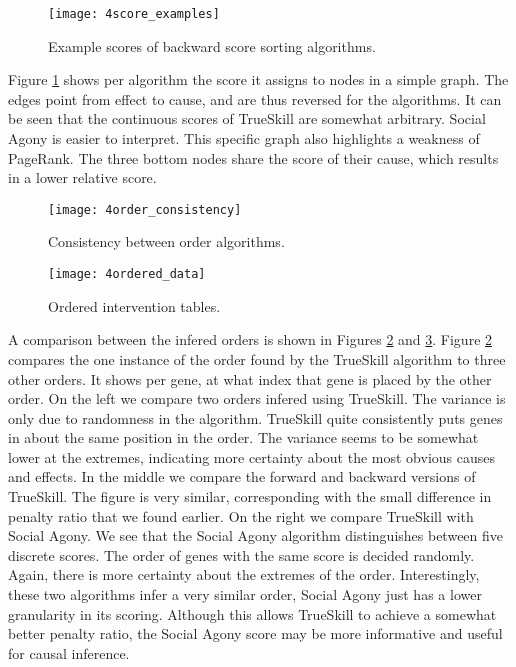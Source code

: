 \begin{figure}[h]
    \centering
    \texttt{[image: 4score\_examples]}
    \caption{Example scores of backward score sorting algorithms.}
    \label{fig:4:scores}
\end{figure}  

Figure \ref{fig:4:scores} shows per algorithm the score it assigns to nodes in a simple graph. The edges point from effect to cause, and are thus reversed for the algorithms. It can be seen that the continuous scores of TrueSkill are somewhat arbitrary. Social Agony is easier to interpret. This specific graph also highlights a weakness of PageRank. The three bottom nodes share the score of their cause, which results in a lower relative score.

\begin{figure}[h]
    \centering
    \texttt{[image: 4order\_consistency]}
    \caption{Consistency between order algorithms.}
    \label{fig:4:consistency}
\end{figure}  

\begin{figure}[h]
    \centering
    \texttt{[image: 4ordered\_data]}
    \caption{Ordered intervention tables.}
    \label{fig:4:ordered}
\end{figure}  

A comparison between the infered orders is shown in Figures \ref{fig:4:consistency} and \ref{fig:4:ordered}. Figure \ref{fig:4:consistency} compares the one instance of the order found by the TrueSkill algorithm to three other orders. It shows per gene, at what index that gene is placed by the other order. On the left we compare two orders infered using TrueSkill. The variance is only due to randomness in the algorithm. TrueSkill quite consistently puts genes in about the same position in the order. The variance seems to be somewhat lower at the extremes, indicating more certainty about the most obvious causes and effects. In the middle we compare the forward and backward versions of TrueSkill. The figure is very similar, corresponding with the small difference in penalty ratio that we found earlier. On the right we compare TrueSkill with Social Agony. We see that the Social Agony algorithm distinguishes between five discrete scores. The order of genes with the same score is decided randomly. Again, there is more certainty about the extremes of the order. Interestingly, these two algorithms infer a very similar order, Social Agony just has a lower granularity in its scoring. Although this allows TrueSkill to achieve a somewhat better penalty ratio, the Social Agony score may be more informative and useful for causal inference. 

